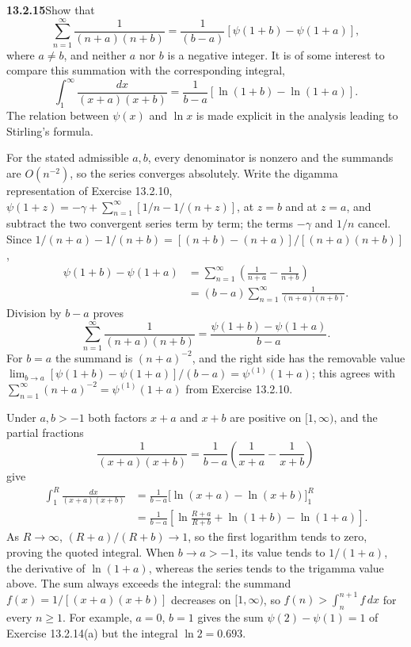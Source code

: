 \par\bigskip
\noindent\textbf{13.2.15}\quad Show that
\[
\sum_{n=1}^{\infty}\frac{1}{(n+a)(n+b)}
=\frac{1}{(b-a)}\left[\psi(1+b)-\psi(1+a)\right],
\]
where $a\neq b$, and neither $a$ nor $b$ is a negative integer. It is of some
interest to compare this summation with the corresponding integral,
\[
\int_{1}^{\infty}\frac{dx}{(x+a)(x+b)}
=\frac{1}{b-a}\left[\ln(1+b)-\ln(1+a)\right].
\]
The relation between $\psi(x)$ and $\ln x$ is made explicit in the analysis
leading to Stirling's formula.
\par\smallskip
{}
\solution
For the stated admissible $a,b$, every denominator is nonzero
and the summands are $O(n^{-2})$, so the series converges
absolutely.  Write the digamma representation of
Exercise 13.2.10,
$\psi(1+z)=-\gamma+\sum_{n=1}^{\infty}[1/n-1/(n+z)]$, at $z=b$
and at $z=a$, and subtract the two convergent series term by
term; the terms $-\gamma$ and $1/n$ cancel.  Since
$1/(n+a)-1/(n+b)=[(n+b)-(n+a)]/[(n+a)(n+b)]$,
\begin{align*}
\psi(1+b)-\psi(1+a)
&=\sum_{n=1}^{\infty}
\left(\frac1{n+a}-\frac1{n+b}\right)\\
&=(b-a)\sum_{n=1}^{\infty}\frac1{(n+a)(n+b)}.
\end{align*}
Division by $b-a$ proves
\[
\boxed{\sum_{n=1}^{\infty}\frac1{(n+a)(n+b)}
=\frac{\psi(1+b)-\psi(1+a)}{b-a}}.
\]
For $b=a$ the summand is $(n+a)^{-2}$, and the right side has
the removable value
$\lim_{b\to a}[\psi(1+b)-\psi(1+a)]/(b-a)=\psi^{(1)}(1+a)$; this
agrees with $\sum_{n=1}^{\infty}(n+a)^{-2}=\psi^{(1)}(1+a)$ from
Exercise 13.2.10.

Under $a,b>-1$ both factors $x+a$ and $x+b$ are positive on
$[1,\infty)$, and the partial fractions
\[
\frac1{(x+a)(x+b)}=\frac1{b-a}\left(\frac1{x+a}-\frac1{x+b}\right)
\]
give
\begin{align*}
\int_1^R\frac{dx}{(x+a)(x+b)}
&=\frac1{b-a}
\bigl[\ln(x+a)-\ln(x+b)\bigr]_1^R\\
&=\frac1{b-a}\left[\ln\frac{R+a}{R+b}
+\ln(1+b)-\ln(1+a)\right].
\end{align*}
As $R\to\infty$, $(R+a)/(R+b)\to1$, so the first logarithm tends
to zero, proving the quoted integral.  When $b\to a>-1$, its value
tends to $1/(1+a)$, the derivative of $\ln(1+a)$, whereas the
series tends to the trigamma value above.  The sum always exceeds
the integral: the summand $f(x)=1/[(x+a)(x+b)]$ decreases on
$[1,\infty)$, so $f(n)>\int_n^{n+1}f\,dx$ for every $n\ge1$.  For
example, $a=0$, $b=1$ gives the sum $\psi(2)-\psi(1)=1$ of
Exercise 13.2.14(a) but the integral $\ln2=0.693$.


